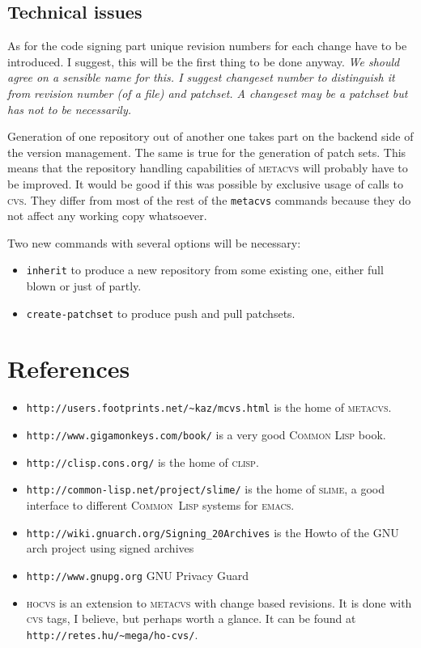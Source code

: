 \documentclass[german, 10pt, a4paper]{article}
\begin{document}
\subsection{Technical issues}

As for the code signing part unique revision numbers for each change have
to be introduced. I suggest, this will be the first thing to be done anyway.
\emph{We should agree on a sensible name for this. I suggest changeset number
to distinguish it from revision number (of a file) and patchset. A changeset
may be a patchset but has not to be necessarily.}

Generation of one repository out of another one takes part on the backend
side of the version management. The same is true for the generation
of patch sets. This means that the repository handling capabilities of
\textsc{metacvs} will probably have to be improved. It would be good if
this was possible by exclusive usage of calls to \textsc{cvs}.
They differ from most of the rest of the \texttt{metacvs} commands
because they do not affect any working copy whatsoever.

Two new commands with several options will be necessary:
\begin{itemize}
\item \texttt{inherit} to produce a new repository from some existing one,
either full blown or just of partly.
\item \texttt{create-patchset} to produce push and pull patchsets.
\end{itemize}

\section{References}

\begin{itemize}
\item \texttt{http://users.footprints.net/\textasciitilde{}kaz/mcvs.html} is the home of
\textsc{metacvs}.
\item \texttt{http://www.gigamonkeys.com/book/} is a very good
\textsc{Common Lisp} book.
\item \texttt{http://clisp.cons.org/} is the home of \textsc{clisp}.
\item \texttt{http://common-lisp.net/project/slime/} is the home of
\textsc{slime}, a good interface to different \textsc{Common~Lisp}
systems for \textsc{emacs}.
\item \texttt{http://wiki.gnuarch.org/Signing\_20Archives} is the Howto of the
GNU arch project using signed archives
\item \texttt{http://www.gnupg.org} GNU Privacy Guard
\item \textsc{hocvs} is an extension to \textsc{metacvs} with change based
revisions. It is done with \textsc{cvs} tags, I believe, but perhaps worth a
glance. It can be found at \texttt{http://retes.hu/\textasciitilde{}mega/ho-cvs/}.
\end{itemize}
\end{document}
